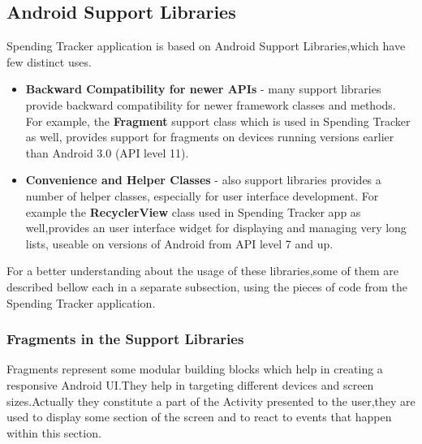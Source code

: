 \subsection{Android Support Libraries}
Spending Tracker application is based on Android Support Libraries,which have few distinct uses.
\begin{itemize}
	\item \textbf{Backward Compatibility for newer APIs} - many support libraries provide backward compatibility for newer framework classes and methods. For example, the \textbf{Fragment} support class which is used in Spending Tracker as well, provides support for fragments on devices running versions earlier than Android 3.0 (API level 11).
	\item \textbf{Convenience and Helper Classes} - also support libraries provides a number of helper classes, especially for user interface development. For example the \textbf{RecyclerView} class used in Spending Tracker app as well,provides an user interface widget for displaying and managing very long lists, useable on versions of Android from API level 7 and up.
\end{itemize}

For a better understanding about the usage of these libraries,some of them are described bellow each in a separate subsection, using the pieces of code from the Spending Tracker application.

\subsubsection{Fragments in the Support Libraries}
Fragments represent some modular building blocks which help in creating a responsive Android UI.They help in targeting different devices and screen sizes.Actually they constitute a part of the Activity presented to the user,they are used to display some section of the screen and to react to events that happen within this section.

